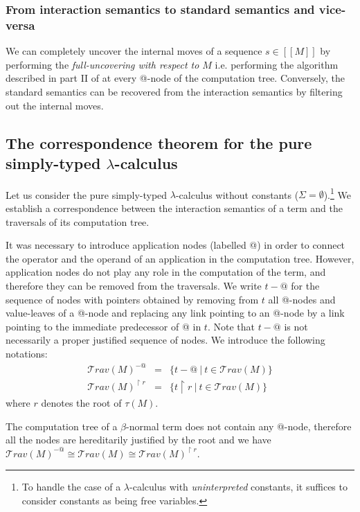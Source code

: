 \documentclass{llncs}
\newcommand\travset{\mathcal{T}rav}
\newcommand{\lsem}{[\![} %
\newcommand{\rsem}{]\!]} %
\newcommand{\sem}[1]{{\lsem #1 \rsem}}
\begin{document}
\subsubsection{From interaction semantics to standard semantics and vice-versa}
We can completely uncover the internal moves of a sequence $s\in\sem{M}$ by performing the \emph{full-uncovering with respect to $M$} i.e. 
performing the algorithm described in part II of \cite{hylandong_pcf} at every @-node of the computation tree.
Conversely, the standard semantics can be recovered from the
interaction semantics by filtering out the internal moves.


\subsection{The correspondence theorem for the pure simply-typed $\lambda$-calculus}

Let us consider the pure simply-typed $\lambda$-calculus without constants ($\Sigma = \emptyset$).\footnote{To handle the case of a $\lambda$-calculus with \emph{uninterpreted} constants, it suffices to
consider constants as being free variables.}
We establish a correspondence between the interaction semantics of a term
and the traversals of its computation tree.

It was necessary to introduce application nodes (labelled @) in order to connect the operator and
the operand of an application in the computation tree. However, application nodes do not play 
any role in the computation of the term, and therefore
they can be removed from the traversals. 
We write $t-@$ for the sequence of nodes with pointers obtained by
removing from $t$ all @-nodes and value-leaves of a @-node and
replacing any link pointing to an @-node by a link pointing to the immediate predecessor of @ in $t$.
Note that $t-@$ is not necessarily a proper justified sequence of nodes.
We introduce the following notations:
\begin{eqnarray*}
\travset(M)^{-@} &=& \{ t - @ \ | \  t \in \travset(M) \} \\
\travset(M)^{\upharpoonright r} &=& \{ t  \upharpoonright r \ | \  t  \in \travset(M) \}
\end{eqnarray*}
where $r$ denotes the root of $\tau(M)$.

\begin{remark}
The computation tree of a $\beta$-normal term does not contain any @-node, therefore all the nodes are
hereditarily justified by the root and we have $\travset(M)^{-@} \cong \travset(M) \cong  \travset(M)^{\upharpoonright r }$.
\end{remark}
\end{document}
